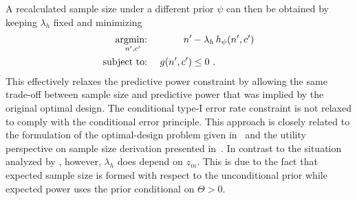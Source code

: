 \documentclass{article}
\newcommand{\st}{\operatorname{subject\ to:\ }}
\newcommand{\argmin}[1]{\operatornamewithlimits{argmin:\ }_{#1}}
\begin{document}
A recalculated sample size under a different prior $\psi$ can then be obtained by 
keeping $\lambda_h$ fixed and minimizing 
\begin{align}
    \argmin{n',c'} && n'&-\lambda_h\, h_\psi(n',c') \\
     \st && g(n', c') &\leq 0 \ . 
\end{align}
This effectively relaxes the predictive power constraint by allowing the same trade-off 
between sample size and predictive power that was implied by the original optimal design.
The conditional type-I error rate constraint is not relaxed to comply with the 
conditional error principle.
This approach is closely related to the formulation of the optimal-design problem given in~\citet{jennison2015} and the utility perspective on sample 
size derivation presented in~\citep{kunzmann2020}.
In contrast to the situation analyzed by \citet{jennison2015}, however,
$\lambda_h$ does depend on $z_m$.
This is due to the fact that expected sample size is formed with respect to the unconditional
prior while expected power uses the prior conditional on $\Theta>0$.
\end{document}
